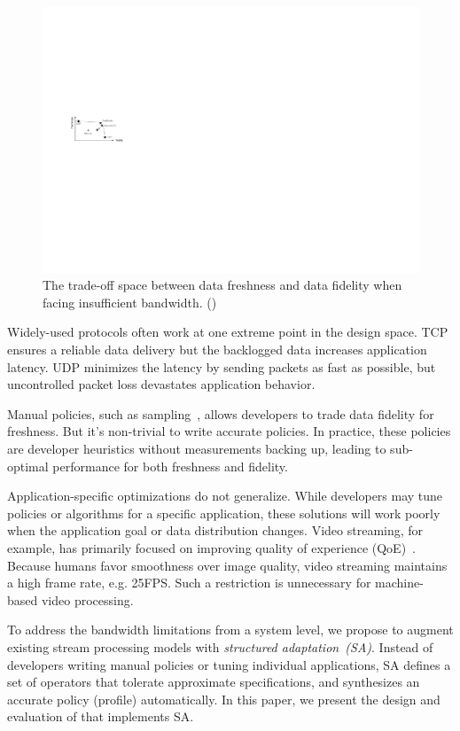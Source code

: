 \begin{figure}
  \centering
  \includegraphics[width=0.9\linewidth]{figures/intro.pdf}
  \caption{The trade-off space between data freshness and data fidelity when
    facing insufficient bandwidth. ()}
  \label{fig:intro}
  \vspace{-1em}
\end{figure}

Widely-used protocols often work at one extreme point in the design space. TCP
ensures a reliable data delivery but the backlogged data increases application
latency. UDP minimizes the latency by sending packets as fast as possible, but
uncontrolled packet loss devastates application behavior.

Manual policies, such as sampling~\cite{rabkin2014aggregation}, allows
developers to trade data fidelity for freshness. But it's non-trivial to write
accurate policies. In practice, these policies are developer heuristics without
measurements backing up, leading to sub-optimal performance for both freshness
and fidelity.

Application-specific optimizations do not generalize. While developers may tune
policies or algorithms for a specific application, these solutions will work
poorly when the application goal or data distribution changes. Video streaming,
for example, has primarily focused on improving quality of experience
(QoE)~\cite{yin2015control}. Because humans favor smoothness over image quality,
video streaming maintains a high frame rate, e.g. 25FPS. Such a restriction is
unnecessary for machine-based video processing.

To address the bandwidth limitations from a system level, we propose to augment
existing stream processing models with \textit{structured
  adaptation~(SA)}. Instead of developers writing manual policies or tuning
individual applications, SA defines a set of operators that tolerate approximate
specifications, and synthesizes an accurate policy (profile) automatically. In
this paper, we present the design and evaluation of \sysname{} that implements
SA.

